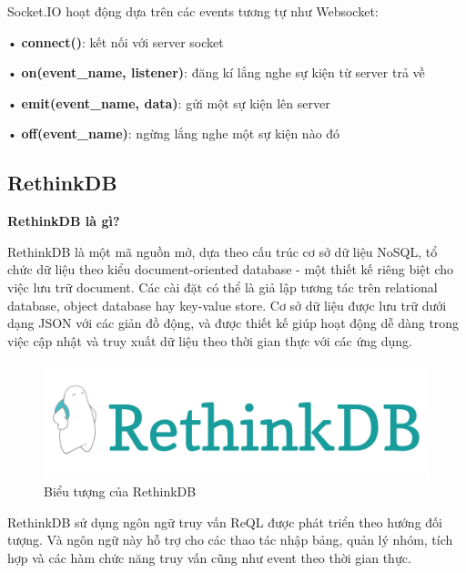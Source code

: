 Socket.IO hoạt động dựa trên các events tương tự như Websocket:

• \textbf{connect()}: kết nối với server socket

• \textbf{on(event\_name, listener)}: đăng kí lắng nghe sự kiện từ server trả về

• \textbf{emit(event\_name, data)}: gửi một sự kiện lên server

• \textbf{off(event\_name)}: ngừng lắng nghe một sự kiện nào đó

\subsection{RethinkDB}

\textbf{RethinkDB là gì?}

RethinkDB là một mã nguồn mở, dựa theo cấu trúc cơ sở dữ liệu NoSQL, tổ chức dữ liệu theo kiểu document-oriented database - một thiết kế riêng biệt cho việc lưu trữ document. Các cài đặt có thể là giả lập tương tác trên relational database, object database hay key-value store. Cơ sở dữ liệu được lưu trữ dưới dạng JSON  với các giản đồ động, và được thiết kế giúp hoạt động dễ dàng trong việc cập nhật và truy xuất dữ liệu theo thời gian thực với các ứng dụng. 

\begin{figure}[H]
	\centering    
	\includegraphics[width=1\textwidth]{rethinkdb}
	\caption[Biểu tượng của RethinkDB]{Biểu tượng của RethinkDB}
	\label{fig: rethinkdb}
\end{figure}

RethinkDB sử dụng ngôn ngữ truy vấn ReQL được phát triển theo hướng đối tượng. Và ngôn ngữ này hỗ trợ cho các thao tác nhập bảng, quản lý nhóm, tích hợp và các hàm chức năng truy vấn cũng như event theo thời gian thực.

